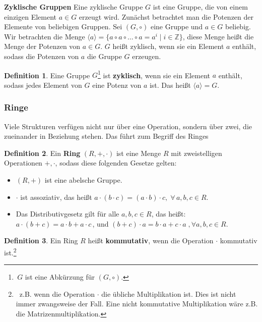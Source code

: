 \documentclass[12pt,oneside]{article}
\theoremstyle{remark}
\theoremstyle{definition}
\newtheorem{definition}{Definition}[section]
\begin{document}
\textbf{Zyklische Gruppen}\newline
Eine zyklische Gruppe $G$ ist eine Gruppe, die von einem einzigen Element $a \in G$ erzeugt wird. Zunächst betrachtet man die Potenzen der Elemente von beliebigen Gruppen. Sei $(G,\circ)$ eine Gruppe und $a \in G$ beliebig. Wir betrachten die Menge $\langle a \rangle = \{ a \circ a \circ \dots \circ a =  a^i \mid i \in \mathbb{Z}\}$, diese Menge heißt die Menge der Potenzen von $a \in G$. $G$ heißt zyklisch, wenn sie ein Element $a$ enthält, sodass die Potenzen von $a$ die Gruppe $G$ erzeugen. 

\begin{definition}
Eine Gruppe $G$\footnote{$\, G $ ist eine Abkürzung für $(G,\circ)$.} ist \textbf{zyklisch}, wenn sie ein Element $a$ enthält, sodass jedes Element von $G$ eine Potenz von $a$ ist. Das heißt $\langle a \rangle = G$.
\end{definition}

\smallskip

\subsubsection{Ringe}
Viele Strukturen verfügen nicht nur über eine Operation, sondern über zwei, die zueinander in Beziehung stehen. Das führt zum Begriff des Ringes

\begin{definition}
Ein \textbf{Ring} $(R,+,\cdot)$ ist eine Menge $R$ mit zweistelligen Operationen $+, \cdot$, sodass diese folgenden Gesetze gelten:
\begin{itemize}
    \item $(R,+)$ ist eine abelsche Gruppe.
    \item $\cdot$ ist assoziativ, das heißt $a \cdot (b \cdot c) = (a \cdot b) \cdot c, \; \forall \, a,b,c \in R $. 
    \item Das Distributivgesetz gilt für alle $a,b,c \in R$, das heißt: $a \cdot (b + c) = a \cdot b + a \cdot c \, $, und  $(b + c) \cdot a = b\cdot a + c \cdot a   \; ,\forall a,b,c \in R$.
\end{itemize}
\end{definition}

\smallskip

\begin{definition}
Ein Ring $R$ heißt \textbf{kommutativ}, wenn die Operation $\cdot$ kommutativ ist.\footnote{ $\,$ z.B. wenn die Operation $\cdot$ die übliche Multiplikation ist. Dies ist nicht immer zwangsweise der Fall. Eine nicht kommutative Multiplikation wäre z.B. die Matrizenmultiplikation.}
\end{definition}
\end{document}

